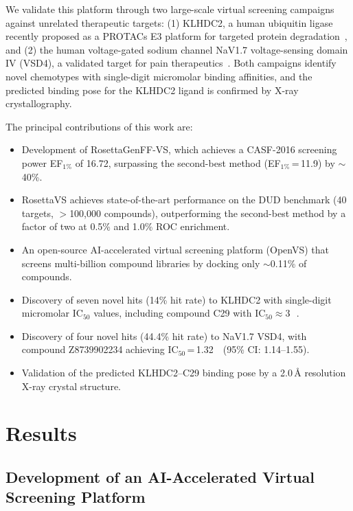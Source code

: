\documentclass[11pt]{article}
\begin{document}
We validate this platform through two large-scale virtual screening campaigns against unrelated therapeutic targets: (1) KLHDC2, a human ubiquitin ligase recently proposed as a PROTACs E3 platform for targeted protein degradation~\citep{klhdc2_structure2019,koren2018degron,protac_klhdc2_2023,klhdc2_kinase2023}, and (2) the human voltage-gated sodium channel NaV1.7 voltage-sensing domain IV (VSD4), a validated target for pain therapeutics~\citep{ahuja2015structural,nav17_pain2017,nav17_inactivation2018}. Both campaigns identify novel chemotypes with single-digit micromolar binding affinities, and the predicted binding pose for the KLHDC2 ligand is confirmed by X-ray crystallography.

The principal contributions of this work are:
\begin{itemize}
    \item Development of RosettaGenFF-VS, which achieves a CASF-2016 screening power EF$_{1\%}$ of 16.72, surpassing the second-best method (EF$_{1\%}$\,=\,11.9) by ${\sim}$40\%.
    \item RosettaVS achieves state-of-the-art performance on the DUD benchmark (40 targets, $>$100,000 compounds), outperforming the second-best method by a factor of two at 0.5\% and 1.0\% ROC enrichment.
    \item An open-source AI-accelerated virtual screening platform (OpenVS) that screens multi-billion compound libraries by docking only ${\sim}$0.11\% of compounds.
    \item Discovery of seven novel hits (14\% hit rate) to KLHDC2 with single-digit micromolar IC$_{50}$ values, including compound C29 with IC$_{50} \approx 3$\,\si{\micro\molar}.
    \item Discovery of four novel hits (44.4\% hit rate) to NaV1.7 VSD4, with compound Z8739902234 achieving IC$_{50}$\,=\,1.32\,\si{\micro\molar} (95\% CI: 1.14--1.55).
    \item Validation of the predicted KLHDC2--C29 binding pose by a 2.0\,\AA{} resolution X-ray crystal structure.
\end{itemize}

\section{Results}

\subsection{Development of an AI-Accelerated Virtual Screening Platform}
\end{document}
